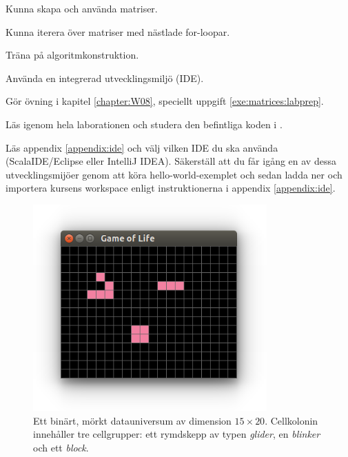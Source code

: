 
\Lab{\LabWeekEIGHT}

\begin{Goals}
\item Kunna skapa och använda matriser.
\item Kunna iterera över matriser med nästlade for-loopar.
\item Träna på algoritmkonstruktion.
\item Använda en integrerad utvecklingsmiljö (IDE).
\end{Goals}

\begin{Preparations}
\item Gör övning {\tt \ExeWeekEIGHT} i kapitel \ref{chapter:W08}, speciellt uppgift \ref{exe:matrices:labprep}.

\item Läs igenom hela laborationen och studera den befintliga koden i \TODO {}.

\item Läs appendix \ref{appendix:ide} och välj vilken IDE du ska använda (ScalaIDE/Eclipse eller IntelliJ IDEA). Säkerställ att du får igång en av dessa utvecklingsmijöer genom att köra hello-world-exemplet och sedan ladda ner och importera kursens \TODO workspace enligt instruktionerna i appendix \ref{appendix:ide}.
\end{Preparations}


\begin{figure}[H]
  \includegraphics[width=0.8\textwidth]{../img/glider-blinker-block}

  \vspace{-2em}\caption{\label{lab:life:glider-blinker-block}Ett binärt, mörkt datauniversum av dimension $15  \times 20$. Cellkolonin innehåller tre cellgrupper: ett rymdskepp av typen \emph{glider}, en \emph{blinker} och ett \emph{block}.}
\end{figure}


